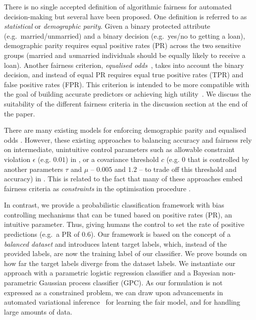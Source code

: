 There is no single accepted definition of algorithmic fairness for automated decision-making
but several have been proposed.
One definition is referred to as \emph{statistical} or \emph{demographic parity}.
Given a binary protected attribute (e.g.\ married/unmarried) and a binary decision (e.g.\ yes/no to getting a loan),
demographic parity requires equal positive rates (PR) across the two sensitive groups (married and \emph{un}married individuals should be equally likely to receive a loan).
%
Another fairness criterion, \emph{equalised odds}~\citep{hardt2016equality},
takes into account the binary decision, and instead of equal PR requires equal true positive rates (TPR) and false positive rates (FPR).
This criterion is intended to be more compatible with the goal of building accurate predictors or achieving high utility~\citep{hardt2016equality}.
We discuss the suitability of the different fairness criteria in the discussion section at the end of the paper.

There are many existing models for enforcing demographic parity and equalised odds
\citep{creager2019flexibly,AgaBeyDudLanetal18,calders2009building,kamishima2012fairness,zafar2017fairnesstreatment,zafar2017fairnessconstraints}.
However, these existing approaches to balancing accuracy and fairness rely on intermediate, unintuitive control parameters such as allowable constraint violation $\epsilon$ (e.g. $0.01$) in \citet{AgaBeyDudLanetal18}, or a covariance threshold $c$
(e.g. $0$ that is controlled by another parameters $\tau$ and $\mu$ -- $0.005$ and $1.2$ -- to trade off this threshold and accuracy)
in \citet{zafar2017fairnesstreatment}.
This is related to the fact that many of these approaches embed fairness criteria as \emph{constraints} in the optimisation procedure
\citep{DonOneBenShaetal18,quadrianto2017recycling,zafar2017fairnesstreatment,zafar2017fairnessconstraints}.

In contrast, we provide a probabilistic classification framework with bias controlling mechanisms that can be tuned based on positive rates (PR),
an intuitive parameter.
Thus, giving humans the control to set the rate of positive predictions (e.g.\ a PR of $0.6$).
Our framework is based on the concept of a \emph{balanced dataset}
and introduces latent target labels, which, instead of the provided labels, are now the training label of our classifier.
We prove bounds on how far the target labels diverge from the dataset labels.
We instantiate our approach with a parametric logistic regression classifier and a Bayesian non-parametric Gaussian process classifier (GPC).
%
As our formulation is not expressed as a constrained problem,
we can draw upon advancements in automated variational inference~\citep{bonilla2016generic,gardner2018gpytorch,krauth2016autogp}
for learning the fair model, and for handling large amounts of data.

